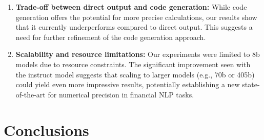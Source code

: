 \documentclass[logo,msc]{infthesis}           %
\begin{document}
\begin{enumerate}
  \item \textbf{Trade-off between direct output and code generation:} While code generation offers the potential for more precise calculations, our results show that it currently underperforms compared to direct output. This suggests a need for further refinement of the code generation approach.
  \item \textbf{Scalability and resource limitations:} Our experiments were limited to 8b models due to resource constraints. The significant improvement seen with the instruct model suggests that scaling to larger models (e.g., 70b or 405b) could yield even more impressive results, potentially establishing a new state-of-the-art for numerical precision in financial NLP tasks.
\end{enumerate}




\chapter{Conclusions}


\end{document}
